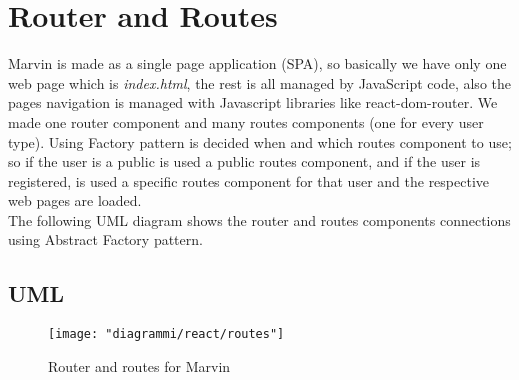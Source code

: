 \documentclass[../react.tex]{subfiles}
\begin{document}
	
	\section{Router and Routes} Marvin is made as a single page application (SPA), so basically we have only one web page which is \textit{index.html}, the rest is all managed by JavaScript code, also the pages navigation is managed with Javascript libraries like react-dom-router. We made one router component and many routes components (one for every user type). Using Factory pattern is decided when and which routes component to use; so if the user is a public is used a public routes component, and if the user is registered, is used a specific routes component for that user and the respective web pages are loaded. \\
	The following UML diagram shows the router and routes components connections using Abstract Factory pattern.
		\subsection{UML}
			\begin{figure}[h]
			\centering
			\texttt{[image: "diagrammi/react/routes"]}
			\caption{Router and routes for Marvin}
			\label{fig:Router and routes for Marvin}
		\end{figure}
		\newpage
	
\end{document}
